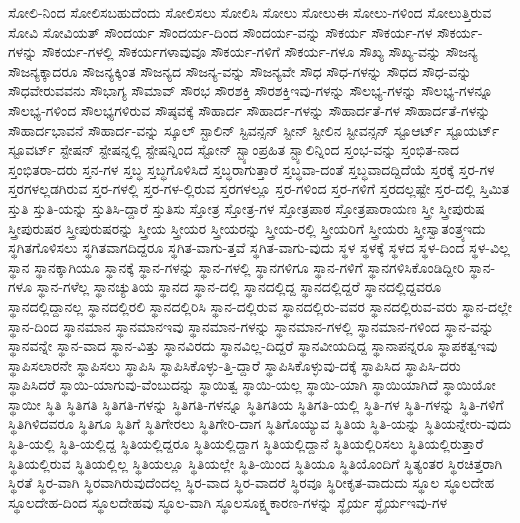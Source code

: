 {ಸೋಲಿ-ನಿಂದ
ಸೋಲಿಸಬಹುದೆಂದು
ಸೋಲಿಸಲು
ಸೋಲಿಸಿ
ಸೋಲು
ಸೋಲುಈ
ಸೋಲು-ಗಳಿಂದ
ಸೋಲುತ್ತಿರುವ
ಸೋವಿ
ಸೋವಿಯತ್
ಸೌಂದರ್ಯ
ಸೌಂದರ್ಯ-ದಿಂದ
ಸೌಂದರ್ಯ-ವನ್ನು
ಸೌಕರ್ಯ
ಸೌಕರ್ಯ-ಗಳ
ಸೌಕರ್ಯ-ಗಳನ್ನು
ಸೌಕರ್ಯ-ಗಳಲ್ಲಿ
ಸೌಕರ್ಯಗಳಾವುವೂ
ಸೌಕರ್ಯ-ಗಳಿಗೆ
ಸೌಕರ್ಯ-ಗಳೂ
ಸೌಖ್ಯ
ಸೌಖ್ಯ-ವನ್ನು
ಸೌಜನ್ಯ
ಸೌಜನ್ಯಕ್ಕಾದರೂ
ಸೌಜನ್ಯಕ್ಕಿಂತ
ಸೌಜನ್ಯದ
ಸೌಜನ್ಯ-ವನ್ನು
ಸೌಜನ್ಯವೇ
ಸೌಧ
ಸೌಧ-ಗಳನ್ನು
ಸೌಧದ
ಸೌಧ-ವನ್ನು
ಸೌಧವೇರುವವನು
ಸೌಭಾಗ್ಯ
ಸೌಮಾವ್
ಸೌರಭ
ಸೌರಶಕ್ತಿ
ಸೌರಶಕ್ತಿಇವು-ಗಳನ್ನು
ಸೌಲಭ್ಯ-ಗಳನ್ನು
ಸೌಲಭ್ಯ-ಗಳನ್ನೂ
ಸೌಲಭ್ಯ-ಗಳಿಂದ
ಸೌಲಭ್ಯಗಳಿರುವ
ಸೌಷ್ಠವಕ್ಕೆ
ಸೌಹಾರ್ದ
ಸೌಹಾರ್ದ-ಗಳನ್ನು
ಸೌಹಾರ್ದತೆ-ಗಳ
ಸೌಹಾರ್ದತೆ-ಗಳನ್ನು
ಸೌಹಾರ್ದಭಾವನೆ
ಸೌಹಾರ್ದ-ವನ್ನು
ಸ್ಕೂಲ್
ಸ್ಟಾಲಿನ್
ಸ್ಟಿವನ್ಸನ್
ಸ್ಟೀನ್
ಸ್ಟೀಲಿನ
ಸ್ಟೀವನ್ಸನ್
ಸ್ಟೂಆರ್ಟ್
ಸ್ಟೂಯರ್ಟ್
ಸ್ಟೂವರ್ಟ್
ಸ್ಟೇಷನ್
ಸ್ಟೇಷನ್ನಲ್ಲಿ
ಸ್ಟೇಷನ್ನಿಂದ
ಸ್ಟೋನ್
ಸ್ಟ್ಯಾಂಪ್ರಹಿತ
ಸ್ಟ್ಯಾಲಿನ್ನಿಂದ
ಸ್ತಂಭ-ವನ್ನು
ಸ್ತಂಭಿತ-ನಾದ
ಸ್ತಂಭಿತರಾ-ದರು
ಸ್ತನ-ಗಳ
ಸ್ತಬ್ಧ
ಸ್ತಬ್ಧಗೊಳಿಸಿದೆ
ಸ್ತಬ್ಧರಾಗುತ್ತಾರೆ
ಸ್ತಬ್ಧವಾ-ದಂತೆ
ಸ್ತಬ್ಧವಾದದ್ದಿದೆಯೆ
ಸ್ತರಕ್ಕೆ
ಸ್ತರ-ಗಳ
ಸ್ತರಗಳಲ್ಲಡಗಿರುವ
ಸ್ತರ-ಗಳಲ್ಲಿ
ಸ್ತರ-ಗಳ-ಲ್ಲಿರುವ
ಸ್ತರಗಳಲ್ಲೂ
ಸ್ತರ-ಗಳಿಂದ
ಸ್ತರ-ಗಳಿಗೆ
ಸ್ತರದಲ್ಲಷ್ಟೇ
ಸ್ತರ-ದಲ್ಲಿ
ಸ್ತಿಮಿತ
ಸ್ತುತಿ
ಸ್ತುತಿ-ಯನ್ನು
ಸ್ತುತಿಸಿ-ದ್ದಾರೆ
ಸ್ತುತಿಸು
ಸ್ತೋತ್ರ
ಸ್ತೋತ್ರ-ಗಳ
ಸ್ತೋತ್ರಪಾಠ
ಸ್ತೋತ್ರಪಾರಾಯಣ
ಸ್ತ್ರೀ
ಸ್ತ್ರೀಪುರುಷ
ಸ್ತ್ರೀಪುರುಷರ
ಸ್ತ್ರೀಪುರುಷರನ್ನು
ಸ್ತ್ರೀಯ
ಸ್ತ್ರೀಯರ
ಸ್ತ್ರೀಯರನ್ನು
ಸ್ತ್ರೀಯ-ರಲ್ಲಿ
ಸ್ತ್ರೀಯರಿಗೆ
ಸ್ತ್ರೀಯರು
ಸ್ತ್ರೀಸ್ವಾತಂತ್ರ್ಯಇದು
ಸ್ಥಗಿತಗೊಳಿಸಲು
ಸ್ಥಗಿತವಾಗದಿದ್ದರೂ
ಸ್ಥಗಿತ-ವಾಗು-ತ್ತವೆ
ಸ್ಥಗಿತ-ವಾಗು-ವುದು
ಸ್ಥಳ
ಸ್ಥಳಕ್ಕೆ
ಸ್ಥಳದ
ಸ್ಥಳ-ದಿಂದ
ಸ್ಥಳ-ವಿಲ್ಲ
ಸ್ಥಾನ
ಸ್ಥಾನಕ್ಕಾಗಿಯೂ
ಸ್ಥಾನಕ್ಕೆ
ಸ್ಥಾನ-ಗಳನ್ನು
ಸ್ಥಾನ-ಗಳಲ್ಲಿ
ಸ್ಥಾನಗಳಿಗೂ
ಸ್ಥಾನ-ಗಳಿಗೆ
ಸ್ಥಾನಗಳಿಸಿಕೊಂಡಿದ್ದೀರಿ
ಸ್ಥಾನ-ಗಳೂ
ಸ್ಥಾನ-ಗಳೆಲ್ಲ
ಸ್ಥಾನಚ್ಯುತಿಯ
ಸ್ಥಾನದ
ಸ್ಥಾನ-ದಲ್ಲಿ
ಸ್ಥಾನದಲ್ಲಿದ್ದ
ಸ್ಥಾನದಲ್ಲಿದ್ದರೆ
ಸ್ಥಾನದಲ್ಲಿದ್ದವರೂ
ಸ್ಥಾನದಲ್ಲಿದ್ದಾನಲ್ಲ
ಸ್ಥಾನದಲ್ಲಿರಲಿ
ಸ್ಥಾನದಲ್ಲಿರಿಸಿ
ಸ್ಥಾನ-ದಲ್ಲಿರುವ
ಸ್ಥಾನದಲ್ಲಿರು-ವವರ
ಸ್ಥಾನದಲ್ಲಿರುವ-ವರು
ಸ್ಥಾನ-ದಲ್ಲೇ
ಸ್ಥಾನ-ದಿಂದ
ಸ್ಥಾನಮಾನ
ಸ್ಥಾನಮಾನಇವು
ಸ್ಥಾನಮಾನ-ಗಳನ್ನು
ಸ್ಥಾನಮಾನ-ಗಳಲ್ಲಿ
ಸ್ಥಾನಮಾನ-ಗಳಿಂದ
ಸ್ಥಾನ-ವನ್ನು
ಸ್ಥಾನವನ್ನೇ
ಸ್ಥಾನ-ವಾದ
ಸ್ಥಾನ-ವಿತ್ತು
ಸ್ಥಾನವಿರದು
ಸ್ಥಾನವಿಲ್ಲ-ದಿದ್ದರೆ
ಸ್ಥಾನವೀಯದಿದ್ದ
ಸ್ಥಾನಾಪನ್ನರೂ
ಸ್ಥಾಪಕತ್ವಇವು
ಸ್ಥಾಪಿಸಲಾರನೇ
ಸ್ಥಾಪಿಸಲು
ಸ್ಥಾಪಿಸಿ
ಸ್ಥಾಪಿಸಿಕೊಳ್ಳು-ತ್ತಿ-ದ್ದಾರೆ
ಸ್ಥಾಪಿಸಿಕೊಳ್ಳುವು-ದಕ್ಕೆ
ಸ್ಥಾಪಿಸಿದ
ಸ್ಥಾಪಿಸಿ-ದರು
ಸ್ಥಾಪಿಸಿದರೆ
ಸ್ಥಾಯಿ-ಯಾಗುವು-ವೆಂಬುದನ್ನು
ಸ್ಥಾಯಿತ್ವ
ಸ್ಥಾಯಿ-ಯಲ್ಲ
ಸ್ಥಾಯಿ-ಯಾಗಿ
ಸ್ಥಾಯಿಯಾಗಿದೆ
ಸ್ಥಾಯಿಯೋ
ಸ್ಥಾಯೀ
ಸ್ಥಿತಿ
ಸ್ಥಿತಿಗತಿ
ಸ್ಥಿತಿಗತಿ-ಗಳನ್ನು
ಸ್ಥಿತಿಗತಿ-ಗಳನ್ನೂ
ಸ್ಥಿತಿಗತಿಯ
ಸ್ಥಿತಿಗತಿ-ಯಲ್ಲಿ
ಸ್ಥಿತಿ-ಗಳ
ಸ್ಥಿತಿ-ಗಳನ್ನು
ಸ್ಥಿತಿ-ಗಳಿಗೆ
ಸ್ಥಿತಿಗಿಳಿದವರೂ
ಸ್ಥಿತಿಗೂ
ಸ್ಥಿತಿಗೆ
ಸ್ಥಿತಿಗೇರಲು
ಸ್ಥಿತಿಗೇರಿ-ದಾಗ
ಸ್ಥಿತಿಗೊಯ್ಯುವ
ಸ್ಥಿತಿಯ
ಸ್ಥಿತಿ-ಯನ್ನು
ಸ್ಥಿತಿಯನ್ನೇರು-ವುದು
ಸ್ಥಿತಿ-ಯಲ್ಲಿ
ಸ್ಥಿತಿ-ಯಲ್ಲಿದ್ದ
ಸ್ಥಿತಿಯಲ್ಲಿದ್ದರೂ
ಸ್ಥಿತಿಯಲ್ಲಿದ್ದಾಗ
ಸ್ಥಿತಿಯಲ್ಲಿದ್ದಾನೆ
ಸ್ಥಿತಿಯಲ್ಲಿರಿಸಲು
ಸ್ಥಿತಿಯಲ್ಲಿರುತ್ತಾರೆ
ಸ್ಥಿತಿಯಲ್ಲಿರುವ
ಸ್ಥಿತಿಯಲ್ಲಿಲ್ಲ
ಸ್ಥಿತಿಯಲ್ಲೂ
ಸ್ಥಿತಿಯಲ್ಲೇ
ಸ್ಥಿತಿ-ಯಿಂದ
ಸ್ಥಿತಿಯೂ
ಸ್ಥಿತಿಯೊಂದಿಗೆ
ಸ್ಥಿತ್ಯಂತರ
ಸ್ಥಿರಚಿತ್ತರಾಗಿ
ಸ್ಥಿರತೆ
ಸ್ಥಿರ-ವಾಗಿ
ಸ್ಥಿರವಾಗಿರುವುದೆಂದಲ್ಲ
ಸ್ಥಿರ-ವಾದ
ಸ್ಥಿರ-ವಾದರೆ
ಸ್ಥಿರವೂ
ಸ್ಥಿರೀಕೃತ-ವಾದುದು
ಸ್ಥೂಲ
ಸ್ಥೂಲದೇಹ
ಸ್ಥೂಲದೇಹ-ದಿಂದ
ಸ್ಥೂಲದೇಹವು
ಸ್ಥೂಲ-ವಾಗಿ
ಸ್ಥೂಲಸೂಕ್ಷ್ಮಕಾರಣ-ಗಳನ್ನು
ಸ್ಥೈರ್ಯ
ಸ್ಥೈರ್ಯಇವು-ಗಳ
}
